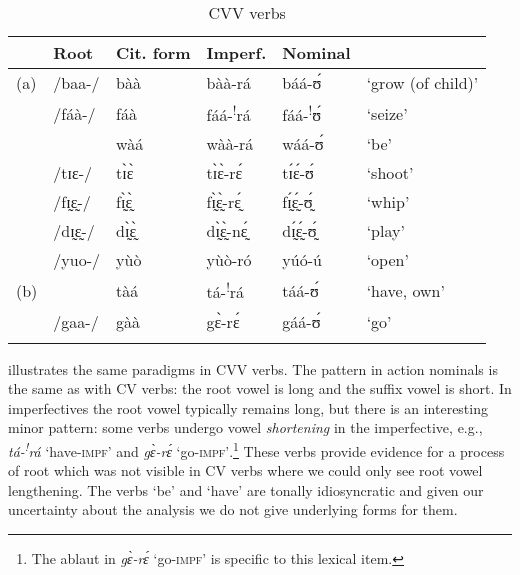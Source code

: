 \documentclass[output=paper,newtxmath,modfonts,nonflat,draftmode]{langsci/langscibook}
\begin{document}
\begin{table}
\begin{tabularx}{\textwidth}{lllllX}
\lsptoprule
& {Root} & {Cit. form} & {Imperf.} & {Nominal} & \\
\midrule
(a)	&/baa-/	&bàà	&bàà-rá	&báá-ʊ́	&‘grow (of child)’\\
	&/fáà-/ &    	fáà &	fáá-\textsuperscript{!}rá	& fáá-\textsuperscript{!}ʊ́	&‘seize’\\
	&	&	wàá	& wàà-rá	&wáá-ʊ́	& ‘be’\\
	&/tɪɛ-/&	tɪ̀ɛ̀	& tɪ̀ɛ̀-rɛ́	&tɪ́ɛ́-ʊ́	& ‘shoot’\\
	&/fɪ̰ɛ̰-/&	fɪ̰̀ɛ̰̀	& fɪ̰̀ɛ̰̀-rɛ̰́	&fɪ̰́ɛ̰́-ʊ̰́	& ‘whip’\\
	&/dɪ̰ɛ̰-/&	dɪ̰̀ɛ̰̀	& dɪ̰̀ɛ̰̀-nɛ̰́	&dɪ̰́ɛ̰́-ʊ̰́	& ‘play’\\
	&/yuo-/	&yùò	& yùò-ró	&yúó-ú	& ‘open’\\
\tablevspace
(b)	&&tàá	& tá-\textsuperscript{!}rá	& táá-ʊ́ & ‘have, own’\\
	&/gaa-/	&gàà	& gɛ̀-rɛ́	&gáá-ʊ́	& ‘go’\\
\lspbottomrule
\end{tabularx}
\caption{CVV verbs}
\label{tab:anttila:8}
\end{table}

  illustrates the same paradigms in CVV verbs. The pattern in action nominals is the same as with CV verbs: the root vowel is long and the suffix vowel is short. In imperfectives the root vowel typically remains long, but there is an interesting minor pattern: some verbs undergo vowel \textit{shortening} in the imperfective, e.g., \textit{tá-\textsuperscript{!}}\textit{rá} ‘have-\textsc{impf}’ and \textit{gɛ̀-rɛ́} ‘go-\textsc{impf’}.\footnote{The ablaut in \textit{gɛ̀-rɛ́} ‘go-\textsc{impf}’ is specific to this lexical item.} These verbs provide evidence for a process of root  which was not visible in CV verbs where we could only see root vowel lengthening. The verbs ‘be’ and ‘have’ are tonally idiosyncratic and given our uncertainty about the analysis we do not give underlying forms for them.
 
\end{document}
